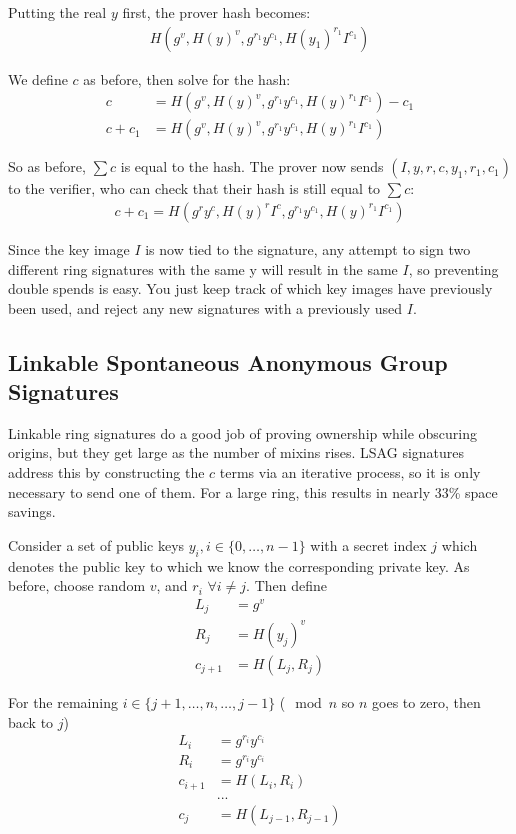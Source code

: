 \documentclass{article}
\begin{document}
Putting the real $y$ first, the prover hash becomes:
\begin{align}
  H(g^v, H(y)^v, g^{r_1} y^{c_1}, H(y_1)^{r_1} I^{c_1})
\end{align}

We define $c$ as before, then solve for the hash:
\begin{align}
  c &= H(g^v, H(y)^v, g^{r_1} y^{c_1}, H(y)^{r_1} I^{c_1}) - c_1\\
  c + c_1 &= H(g^v, H(y)^v, g^{r_1} y^{c_1}, H(y)^{r_1} I^{c_1})
\end{align}

So as before, $\sum c$ is equal to the hash.  The prover now sends $(I, y, r, c, y_1, r_1, c_1)$ to the verifier, who can check that their hash is still equal to $\sum c$:
\begin{align}
  c + c_1 = H(g^r y^c, H(y)^r I^c, g^{r_1} y^{c_1}, H(y)^{r_1} I^{c_1})
\end{align}

Since the key image $I$ is now tied to the signature, any attempt to sign two different ring signatures with the same y will result in the same $I$, so preventing double spends is easy.  You just keep track of which key images have previously been used, and reject any new signatures with a previously used $I$.


\subsection{Linkable Spontaneous Anonymous Group Signatures}

Linkable ring signatures do a good job of proving ownership while obscuring origins, but they get large as the number of mixins rises. LSAG signatures address this by constructing the $c$ terms via an iterative process, so it is only necessary to send one of them.  For a large ring, this results in nearly 33\% space savings.

Consider a set of public keys $y_i, i \in \{0, …, n-1\}$ with a secret index $j$ which denotes the public key to which we know the corresponding private key.  As before, choose random $v$, and $r_i$ $\forall i \ne j$.  Then define
\begin{align}
      L_j &= g^v\\
      R_j &= H(y_j)^v\\
  c_{j+1} &= H(L_j,R_j)
\end{align}

For the remaining $i \in \{j+1, …, n, …, j-1\}$ ($\mod{n}$ so $n$ goes to zero, then back to $j$)
\begin{align}
  L_i &= g^{r_i} y^{c_i}\\
  R_i &= g^{r_i} y^{c_i}\\
  c_{i+1} &= H(L_i,R_i)\\
  &... \\
  c_j &= H(L_{j-1}, R_{j-1})
\end{align}
\end{document}
